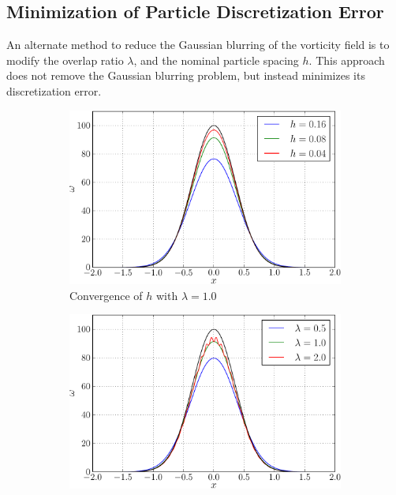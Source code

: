 \subsection{Minimization of Particle Discretization Error}
\label{subsubsec:convergenceInterpolation}
An alternate method to reduce the Gaussian blurring of the vorticity field is to modify the overlap ratio $\lambda$, and the nominal particle spacing $h$. This approach does not remove the Gaussian blurring problem, but instead minimizes its discretization error.
	
\begin{figure}[!b]
        \centering
        \begin{subfigure}[b]{0.45\textwidth}
                \includegraphics[width=\textwidth]{figures/lagrangian/betterInitialization_h-crop.pdf}
                \caption{Convergence of $h$ with $\lambda = 1.0$}
                \label{fig:convergenceOfBlobsH}
        \end{subfigure}%
        \qquad %
        \begin{subfigure}[b]{0.45\textwidth}
                \includegraphics[width=\textwidth]{figures/lagrangian/betterInitialization_overlap_cor-crop.pdf}

\end{subfigure}
\end{figure}
